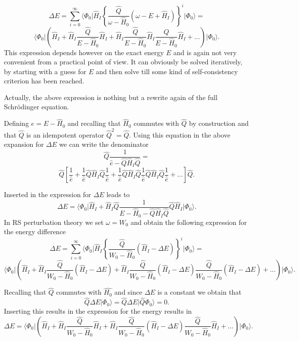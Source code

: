 \[
\Delta E=\sum_{i=0}^{\infty}\langle \Phi_0\vert \hat{H}_I\left\{\frac{\hat{Q}}{\omega-\hat{H}_0}\left(\omega-E+\hat{H}_I\right)\right\}^i\vert \Phi_0\rangle=\]
\[
\langle \Phi_0\vert \left(\hat{H}_I+\hat{H}_I\frac{\hat{Q}}{E-\hat{H}_0}\hat{H}_I+
\hat{H}_I\frac{\hat{Q}}{E-\hat{H}_0}\hat{H}_I\frac{\hat{Q}}{E-\hat{H}_0}\hat{H}_I+\dots\right)\vert \Phi_0\rangle. 
\]
This expression depends however on the exact energy $E$ and is again not very convenient from a practical point of view. It can obviously be solved iteratively, by starting with a guess for  $E$ and then solve till some kind of self-consistency criterion has been reached. 

Actually, the above expression is nothing but a rewrite again of the full Schr\"odinger equation. 

Defining $e=E-\hat{H}_0$ and recalling that $\hat{H}_0$ commutes with 
$\hat{Q}$ by construction and that $\hat{Q}$ is an idempotent operator
$\hat{Q}^2=\hat{Q}$. 
Using this equation in the above expansion for $\Delta E$ we can write the denominator 
\[
\hat{Q}\frac{1}{\hat{e}-\hat{Q}\hat{H}_I\hat{Q}}=
\]
\[
\hat{Q}\left[\frac{1}{\hat{e}}+\frac{1}{\hat{e}}\hat{Q}\hat{H}_I\hat{Q}
\frac{1}{\hat{e}}+\frac{1}{\hat{e}}\hat{Q}\hat{H}_I\hat{Q}
\frac{1}{\hat{e}}\hat{Q}\hat{H}_I\hat{Q}\frac{1}{\hat{e}}+\dots\right]\hat{Q}.
\]

Inserted in the expression for $\Delta E$ leads to 
\[
\Delta E=
\langle \Phi_0\vert \hat{H}_I+\hat{H}_I\hat{Q}\frac{1}{E-\hat{H}_0-\hat{Q}\hat{H}_I\hat{Q}}\hat{Q}\hat{H}_I\vert \Phi_0\rangle. 
\]
In RS perturbation theory we set $\omega = W_0$ and obtain the following expression for the energy difference
\[
\Delta E=\sum_{i=0}^{\infty}\langle \Phi_0\vert \hat{H}_I\left\{\frac{\hat{Q}}{W_0-\hat{H}_0}\left(\hat{H}_I-\Delta E\right)\right\}^i\vert \Phi_0\rangle=
\]
\[
\langle \Phi_0\vert \left(\hat{H}_I+\hat{H}_I\frac{\hat{Q}}{W_0-\hat{H}_0}(\hat{H}_I-\Delta E)+
\hat{H}_I\frac{\hat{Q}}{W_0-\hat{H}_0}(\hat{H}_I-\Delta E)\frac{\hat{Q}}{W_0-\hat{H}_0}(\hat{H}_I-\Delta E)+\dots\right)\vert \Phi_0\rangle.
\]



Recalling that $\hat{Q}$ commutes with $\hat{H_0}$ and since $\Delta E$ is a constant we obtain that
\[
\hat{Q}\Delta E\vert \Phi_0\rangle = \hat{Q}\Delta E\vert \hat{Q}\Phi_0\rangle = 0.
\]
Inserting this results in the expression for the energy results in
\[
\Delta E=\langle \Phi_0\vert \left(\hat{H}_I+\hat{H}_I\frac{\hat{Q}}{W_0-\hat{H}_0}\hat{H}_I+
\hat{H}_I\frac{\hat{Q}}{W_0-\hat{H}_0}(\hat{H}_I-\Delta E)\frac{\hat{Q}}{W_0-\hat{H}_0}\hat{H}_I+\dots\right)\vert \Phi_0\rangle.
\]



